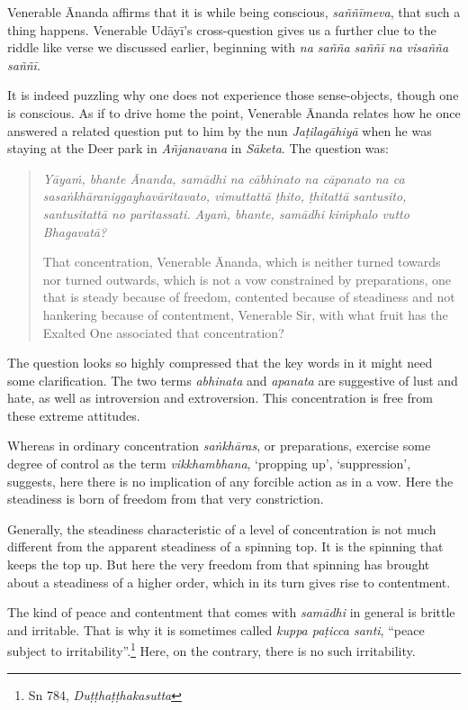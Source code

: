 Venerable Ānanda affirms that it is while being conscious, \emph{saññīmeva}, that such a thing happens. Venerable Udāyī's cross-question gives us a further clue to the riddle like verse we discussed earlier, beginning with \emph{na sañña saññī na visañña saññī}.

It is indeed puzzling why one does not experience those sense-objects, though one is conscious. As if to drive home the point, Venerable Ānanda relates how he once answered a related question put to him by the nun \emph{Jaṭilagāhiyā} when he was staying at the Deer park in \emph{Añjanavana} in \emph{Sāketa}. The question was:

\begin{quote}
\emph{Yāyaṁ, bhante Ānanda, samādhi na cābhinato na cāpanato na ca sasaṅkhāraniggayhavāritavato, vimuttattā ṭhito, ṭhitattā santusito, santusitattā no paritassati. Ayaṁ, bhante, samādhi kiṁphalo vutto Bhagavatā?}

That concentration, Venerable Ānanda, which is neither turned towards nor turned outwards, which is not a vow constrained by preparations, one that is steady because of freedom, contented because of steadiness and not hankering because of contentment, Venerable Sir, with what fruit has the Exalted One associated that concentration?
\end{quote}

The question looks so highly compressed that the key words in it might need some clarification. The two terms \emph{abhinata} and \emph{apanata} are suggestive of lust and hate, as well as introversion and extroversion. This concentration is free from these extreme attitudes.

Whereas in ordinary concentration \emph{saṅkhāras}, or preparations, exercise some degree of control as the term \emph{vikkhambhana}, `propping up', `suppression', suggests, here there is no implication of any forcible action as in a vow. Here the steadiness is born of freedom from that very constriction.

Generally, the steadiness characteristic of a level of concentration is not much different from the apparent steadiness of a spinning top. It is the spinning that keeps the top up. But here the very freedom from that spinning has brought about a steadiness of a higher order, which in its turn gives rise to contentment.

The kind of peace and contentment that comes with \emph{samādhi} in general is brittle and irritable. That is why it is sometimes called \emph{kuppa paṭicca santi}, ``peace subject to irritability''.\footnote{Sn 784, \emph{Duṭṭhaṭṭhakasutta}} Here, on the contrary, there is no such irritability.

